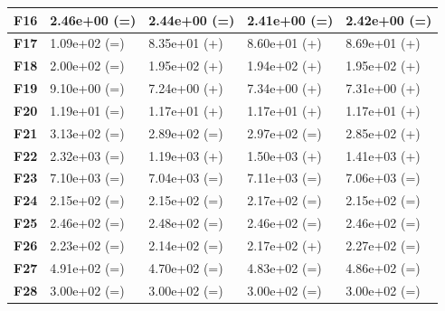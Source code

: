 \documentclass[12pt,a4paper]{report}
\begin{document}
{{{{{{{\begin{table}[h]
\begin{tabular}{|l|l|l|l|l|}
{\bf F16} & 2.46e+00 (=)        & 2.44e+00 (=)     & 2.41e+00 (=)      & 2.42e+00 (=)      \\ \hline
{\bf F17} & 1.09e+02 (=)        & 8.35e+01 (+)     & 8.60e+01 (+)      & 8.69e+01 (+)      \\ \hline
{\bf F18} & 2.00e+02 (=)        & 1.95e+02 (+)     & 1.94e+02 (+)      & 1.95e+02 (+)      \\ \hline
{\bf F19} & 9.10e+00 (=)        & 7.24e+00 (+)     & 7.34e+00 (+)      & 7.31e+00 (+)      \\ \hline
{\bf F20} & 1.19e+01 (=)        & 1.17e+01 (+)     & 1.17e+01 (+)      & 1.17e+01 (+)      \\ \hline
{\bf F21} & 3.13e+02 (=)        & 2.89e+02 (=)     & 2.97e+02 (=)      & 2.85e+02 (+)      \\ \hline
{\bf F22} & 2.32e+03 (=)        & 1.19e+03 (+)     & 1.50e+03 (+)      & 1.41e+03 (+)      \\ \hline
{\bf F23} & 7.10e+03 (=)        & 7.04e+03 (=)     & 7.11e+03 (=)      & 7.06e+03 (=)      \\ \hline
{\bf F24} & 2.15e+02 (=)        & 2.15e+02 (=)     & 2.17e+02 (=)      & 2.15e+02 (=)      \\ \hline
{\bf F25} & 2.46e+02 (=)        & 2.48e+02 (=)     & 2.46e+02 (=)      & 2.46e+02 (=)      \\ \hline
{\bf F26} & 2.23e+02 (=)        & 2.14e+02 (=)     & 2.17e+02 (+)      & 2.27e+02 (=)      \\ \hline
{\bf F27} & 4.91e+02 (=)        & 4.70e+02 (=)     & 4.83e+02 (=)      & 4.86e+02 (=)      \\ \hline
{\bf F28} & 3.00e+02 (=)        & 3.00e+02 (=)     & 3.00e+02 (=)      & 3.00e+02 (=)      \\ \hline
\end{tabular}
\end{table}

}}}}}}}
\end{document}
